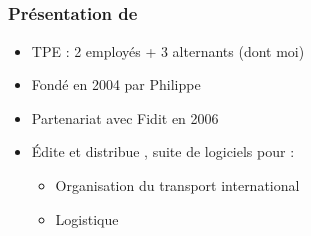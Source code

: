 \subsection{\solulog}

\begin{frame}
	\frametitle{Présentation de \solulog}
	
	\begin{itemize}
		\item TPE : 2 employés + 3 alternants (dont moi)\sautligne
		
		\item Fondé en 2004 par Philippe 
		\item Partenariat avec Fidit en 2006\sautligne
		
		\item \'Edite et distribue , suite de logiciels pour :
			\begin{itemize}
				\item Organisation du transport international
				\item Logistique
			\end{itemize}
	\end{itemize}
\end{frame}
